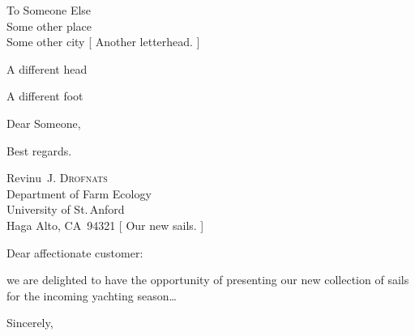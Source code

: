 \begin{foldedletterhead}{
	To Someone Else\\
	Some other place\\
	Some other city
}[
	Another	letterhead.
]

\begin{customletterhead}{\textwidth}
	\raggedright \Huge
	A different	head
\end{customletterhead}
\begin{customletterfoot}{\textwidth}
	\centering
	A different	foot
\end{customletterfoot}

\opening{Dear Someone,}

\lipsum[1-2]

\closing{Best regards.}

\end{foldedletterhead}

\endgroup







\begin{foldedletterhead}[R.~J.~Drofnats]{
	Revinu~J. \textsc{Drofnats}\\
	Department of Farm Ecology\\
	University of St.\,Anford\\
	Haga Alto, CA~94321
}[
	Our new sails.
]

\address{
    Mike Y. \textsc{Name}\\
	Sails Manager\\
    \protect\url{m.y.name@my.company.com}
}
\signature{Mike Y. Name\\Sails Manager}
\date{February~8, 2015}

\opening{Dear affectionate customer:}

we are delighted to have the opportunity of presenting our new collection of
sails for the incoming yachting season\ldots

\lipsum[1-2]

\closing{Sincerely,}


\end{foldedletterhead}



